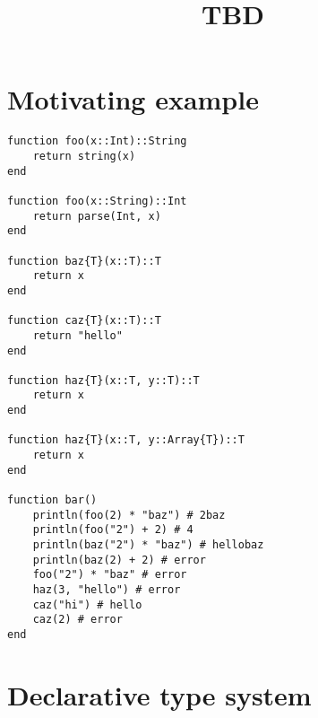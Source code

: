 \documentclass{report} %
\begin{document}
	
\title{TBD}
\maketitle	
	

\section*{Motivating example}

\begin{verbatim}
function foo(x::Int)::String
	return string(x)
end

function foo(x::String)::Int
	return parse(Int, x)
end

function baz{T}(x::T)::T
    return x
end

function caz{T}(x::T)::T
	return "hello"
end

function haz{T}(x::T, y::T)::T
	return x
end

function haz{T}(x::T, y::Array{T})::T
	return x
end

function bar()
    println(foo(2) * "baz") # 2baz
    println(foo("2") + 2) # 4
    println(baz("2") * "baz") # hellobaz
    println(baz(2) + 2) # error
    foo("2") * "baz" # error
    haz(3, "hello") # error
    caz("hi") # hello
    caz(2) # error
end

\end{verbatim}


\section*{Declarative type system}
\end{document}

